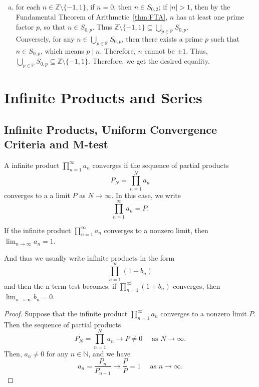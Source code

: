 \documentclass{elegantbook}
\begin{document}
\begin{problemset}[Exercises]
\begin{solution}
\begin{enumerate}[(a)]
\[      \]
      which is a union of sets in $\mathcal{B}$ and hence is open. Therefore, $S_{a, q}$ is closed.
      \item for each $n\in \mathbb{Z}\setminus \{-1, 1\}$, if $n=0$, then $n\in S_{0,2}$; if $|n|>1$, then by the Fundamental Theorem of Arithmetic~\ref{thm:FTA}, $n$ has at least one prime factor $p$, so that $n \in S_{0,p}$. Thus $\mathbb{Z} \setminus \{-1, 1\} \subseteq \bigcup_{p \in \mathbb{P}} S_{0, p}$. \\
      Conversely, for any $n \in \bigcup_{p \in \mathbb{P}} S_{0, p}$, then there exists a prime $p$ such that $n \in S_{0, p}$, which means $p \mid n$. Therefore, $n$ cannot be $\pm 1$. Thus, $\bigcup_{p \in \mathbb{P}} S_{0, p} \subseteq \mathbb{Z} \setminus \{-1, 1\}$. Therefore, we get the desired equality.
    \end{enumerate}
  \end{solution}
\end{problemset}




\chapter{Infinite Products and Series}

\section{Infinite Products, Uniform Convergence Criteria and M-test}

\begin{definition}
  A infinite product $\prod_{n=1}^{\infty} a_n$ converges if the sequence of partial products
  \[
    P_N = \prod_{n=1}^{N} a_n
  \]
  converges to a a limit $P$ as $N \to \infty$. In this case, we write
  \[
    \prod_{n=1}^{\infty} a_n = P.
  \]
\end{definition}

\begin{theorem}
  If the infinite product $\prod_{n=1}^{\infty} a_n$ converges to a nonzero limit, then $\lim_{n \to \infty} a_n = 1$.

  And thus we usually write infinite products in the form
  \[
    \prod_{n=1}^{\infty} (1 + b_n)
  \]
  and then the n-term test becomes: if $\prod_{n=1}^{\infty} (1 + b_n)$ converges, then $\lim_{n \to \infty} b_n = 0$.
\end{theorem}

\begin{proof}
  Suppose that the infinite product $\prod_{n=1}^{\infty} a_n$ converges to a nonzero limit $P$. Then the sequence of partial products
  \[
    P_N = \prod_{n=1}^{N} a_n \to P \ne 0 \quad \text{ as } N \to \infty.
  \]
  Then, $a_n\ne 0$ for any $n\in\mathbb{N}$, and we have
  \[
    a_n = \frac{P_n}{P_{n-1}} \to \frac{P}{P} = 1 \quad \text{ as } n \to \infty.
  \]
\end{proof}
\end{document}
